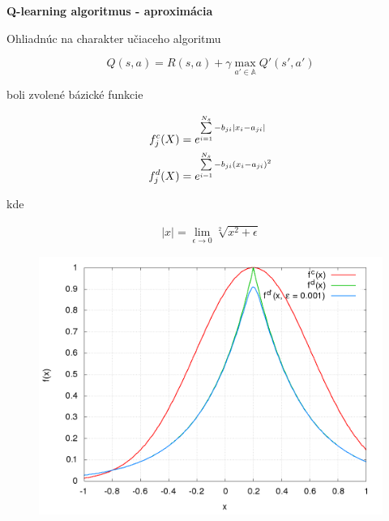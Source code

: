 \documentclass[xcolor=dvipsnames]{beamer}
\begin{document}
\begin{frame}{\bf Q-learning algoritmus - aproximácia}

Ohliadnúc na charakter učiaceho algoritmu

\begin{equation} \label{eu_eqn}
Q(s,a) = R(s,a) + \gamma \max_{a' \in \mathbb{A}} Q'(s', a') \nonumber
\end{equation}



\begin{minipage}{.5\textwidth}
  boli zvolené bázické funkcie

  \begin{align}
      f_j^c(\boldmath{X}) &= e^{ \sum\limits_{i=1}^{N_s}{-b_{ji}\mid x_i - a_{ji} \mid}} \nonumber \\
      f_j^d(\boldmath{X}) &= e^{ \sum\limits_{i=1}^{N_s}{-b_{ji}(x_i - a_{ji})^2} } \nonumber
  \end{align}

kde

  \begin{align}
      \mid x \mid = \lim_{\epsilon \to 0} \sqrt[2]{x^2 + \epsilon}  \nonumber
  \end{align}


\end{minipage}%
\begin{minipage}{.5\textwidth}

  \begin{figure}[!htb]
  \includegraphics[scale=.2]{../pictures/gaussian_1D.png}
  \end{figure}

\end{minipage}





\end{frame}
\end{document}
